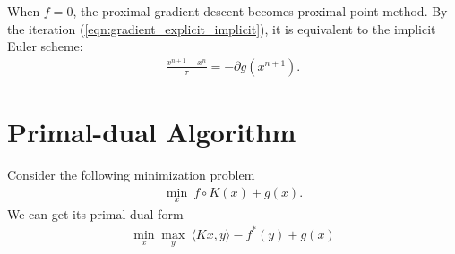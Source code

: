 \documentclass[11pt]{book}
\begin{document}
When $f = 0$, the proximal gradient descent becomes proximal point method. By the iteration (\ref{eqn:gradient_explicit_implicit}), it is equivalent to the implicit Euler scheme:
\begin{align}\label{eqn:gradient_implicit}
  \frac{x^{n+1}-x^n}{\tau} = - \partial g(x^{n+1}).
\end{align}



\section{Primal-dual Algorithm}

Consider the following minimization problem
\begin{align}
  \min_x \  f\circ K(x) + g(x).
\end{align}
We can get its primal-dual form
\begin{align}\label{eqn:primal_dual}
  \min_x \max_y \ \langle Kx, y  \rangle - f^*(y) + g(x)
\end{align}
\end{document}
